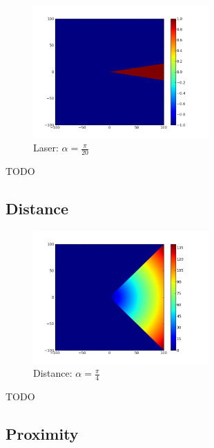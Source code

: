 \documentclass[a4paper]{article}
\begin{document}
\begin{figure}[h]
	\vspace{-20pt}
	\begin{center}
		\includegraphics[width=0.6\textwidth]{graphs/sensors/laser.png}
	\end{center}
	\vspace{-20pt}
	\caption{Laser: $\alpha=\frac{\pi}{20}$}
\end{figure}

TODO

\cleardoublepage
\subsection{Distance}

\begin{figure}[h]
	\vspace{-20pt}
	\begin{center}
		\includegraphics[width=0.6\textwidth]{graphs/sensors/distance.png}
	\end{center}
	\vspace{-20pt}
	\caption{Distance: $\alpha=\frac{\pi}{4}$}
\end{figure}

TODO

\cleardoublepage
\subsection{Proximity}
\end{document}
